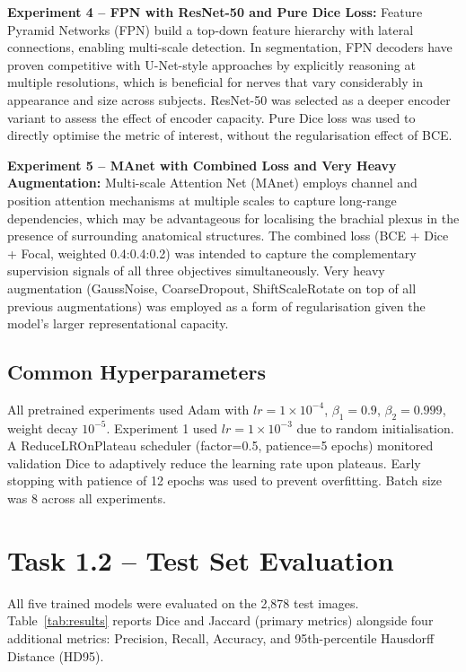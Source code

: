 \documentclass[11pt,a4paper]{article}
\begin{document}
\textbf{Experiment 4 -- FPN with ResNet-50 and Pure Dice Loss:}
Feature Pyramid Networks (FPN) \cite{lin2017fpn} build a top-down feature hierarchy
with lateral connections, enabling multi-scale detection. In segmentation, FPN decoders
have proven competitive with U-Net-style approaches by explicitly reasoning at multiple
resolutions, which is beneficial for nerves that vary considerably in appearance and size
across subjects.
ResNet-50 was selected as a deeper encoder variant to assess the effect of encoder
capacity.
Pure Dice loss was used to directly optimise the metric of interest, without the
regularisation effect of BCE.

\textbf{Experiment 5 -- MAnet with Combined Loss and Very Heavy Augmentation:}
Multi-scale Attention Net (MAnet) \cite{fan2020manet} employs channel and position
attention mechanisms at multiple scales to capture long-range dependencies, which may
be advantageous for localising the brachial plexus in the presence of surrounding
anatomical structures.
The combined loss (BCE + Dice + Focal, weighted 0.4:0.4:0.2) was intended to capture
the complementary supervision signals of all three objectives simultaneously.
Very heavy augmentation (GaussNoise, CoarseDropout, ShiftScaleRotate on top of all
previous augmentations) was employed as a form of regularisation given the model's
larger representational capacity.

\subsection{Common Hyperparameters}

All pretrained experiments used Adam \cite{kingma2014adam} with
$lr = 1 \times 10^{-4}$, $\beta_1 = 0.9$, $\beta_2 = 0.999$, weight decay $10^{-5}$.
Experiment 1 used $lr = 1 \times 10^{-3}$ due to random initialisation.
A ReduceLROnPlateau scheduler (factor=0.5, patience=5 epochs) monitored validation Dice
to adaptively reduce the learning rate upon plateaus.
Early stopping with patience of 12 epochs was used to prevent overfitting.
Batch size was 8 across all experiments.

\section{Task 1.2 -- Test Set Evaluation}

All five trained models were evaluated on the 2,878 test images.
Table~\ref{tab:results} reports Dice and Jaccard (primary metrics) alongside four
additional metrics: Precision, Recall, Accuracy, and 95th-percentile Hausdorff
Distance (HD95).
\end{document}
